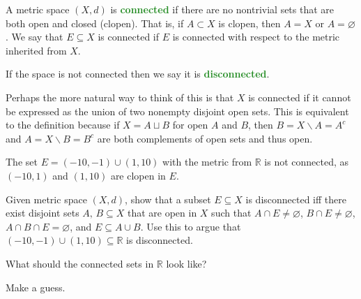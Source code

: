 \documentclass[10pt]{scrartcl}
\providecommand{\RR}{\mathbb R}
\providecommand{\vocab}[1]{{\textbf{\textcolor{ForestGreen}{#1}}}}
\begin{document}
\begin{definition}
	\label{wk8:def:connected}
	A metric space $(X, d)$ is \vocab{connected} if
	there are no nontrivial sets that are both open and closed (clopen).
	That is, if $A\subset X$ is clopen, then $A = X$ or $A = \varnothing$.
	We say that $E\subseteq X$ is connected if
	$E$ is connected with respect to the metric inherited from $X$.
	
	If the space is not connected then we say it is \vocab{disconnected}.
\end{definition}

Perhaps the more natural way to think of this is that
$X$ is connected if it cannot be expressed as
the union of two nonempty disjoint open sets.
This is equivalent to the definition because
if $X = A\sqcup B$ for open $A$ and $B$, then
$B = X\smallsetminus A = A^c$ and $A = X\smallsetminus B = B^c$
are both complements of open sets and thus open.

\begin{example}
	The set $E = (-10, -1) \cup (1, 10)$ with the metric from $\RR$
	is not connected, as $(-10, 1)$ and $(1, 10)$ are clopen in $E$.
\end{example}

\begin{exercise}
	\label{wk8:exer:subspace-disconn}
	Given metric space $(X, d)$, show that
	a subset $E\subseteq X$ is disconnected iff
	there exist disjoint sets $A,\,B\subseteq X$ that are open in $X$
	such that $A\cap E\ne\varnothing$, $B\cap E\ne\varnothing$,
	$A\cap B\cap E = \varnothing$, and $E\subseteq A\cup B$.
	Use this to argue that $(-10, -1)\cup (1, 10)\subseteq \RR$
	is disconnected.
\end{exercise}

What should the connected sets in $\RR$ look like?
\begin{exercise}
	Make a guess.
\end{exercise}
\end{document}
